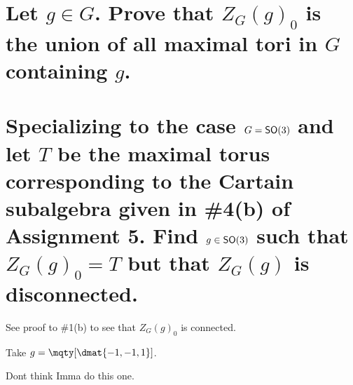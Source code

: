 \documentclass[
	pages,
	boxes,
	color=WildStrawberry
]{homework}
\begin{document}
\begin{problem}
\begin{parts}
	\part{Let $g\in G$. Prove that $Z_G(g)_0$ is the union of all maximal tori in $G$ containing $g$.}\label{part:2a}
	\part{Specializing to the case $G = \mathsf{SO}(3)$ and let $T$ be the maximal torus corresponding to the Cartain subalgebra given in \#4(b) of Assignment 5. Find $g\in \mathsf{SO}(3)$ such that $Z_G(g)_0 = T$ but that $Z_G(g)$ is disconnected.}\label{part:2b}
\end{parts}
\end{problem}

\begin{solution}
	\ref{part:2a}
	See proof to \#1(b) to see that $Z_G(g)_0$ is connected.

	\ref{part:2b}
	Take $g = \mqty[\dmat{-1, -1, 1}]$.
\end{solution}

\begin{problem}
Dont think Imma do this one.
\end{problem}

\begin{solution}

\end{solution}
\end{document}
